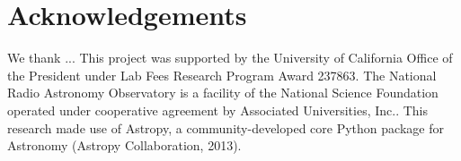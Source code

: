 \documentclass[twocolumn]{aastex61}
\begin{document}


\section*{Acknowledgements}
We thank ...
This project was supported by the University of California Office of the President under Lab Fees Research Program Award 237863. The National Radio Astronomy Observatory is a facility of the National Science Foundation operated under cooperative agreement by Associated Universities, Inc.. This research made use of Astropy, a community-developed core Python package for Astronomy (Astropy Collaboration, 2013).




\end{document}
